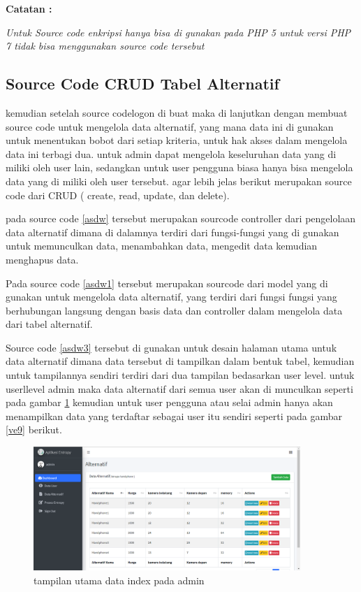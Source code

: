 \textbf{Catatan :}\par
\textit{Untuk Source code enkripsi hanya bisa di gunakan pada PHP 5 untuk versi PHP 7 tidak bisa menggunakan source code tersebut}
\pagebreak

\subsection{Source Code CRUD Tabel Alternatif}
	kemudian setelah source codelogon di buat maka di lanjutkan dengan membuat source code untuk mengelola data alternatif, yang mana data ini di gunakan untuk menentukan bobot dari setiap kriteria, untuk hak akses dalam mengelola data ini terbagi dua. untuk admin dapat mengelola keseluruhan data yang di miliki oleh user lain, sedangkan untuk user pengguna biasa hanya bisa mengelola data yang di miliki oleh user tersebut. agar lebih jelas berikut merupakan source code dari CRUD ( create, read, update, dan delete).

	pada source code \ref{asdw} tersebut merupakan sourcode controller dari pengelolaan data alternatif dimana di dalamnya terdiri dari fungsi-fungsi yang di gunakan untuk memunculkan data, menambahkan data, mengedit data kemudian menghapus data.

	Pada source code \ref{asdw1} tersebut merupakan sourcode dari model yang di gunakan untuk mengelola data alternatif, yang terdiri dari fungsi fungsi yang berhubungan langsung dengan basis data dan controller dalam mengelola data dari tabel alternatif.

	Source code \ref{asdw3} tersebut di gunakan untuk desain halaman utama untuk data alternatif dimana data tersebut di tampilkan dalam bentuk tabel, kemudian untuk tampilannya sendiri terdiri dari dua tampilan bedasarkan user level. untuk userllevel admin maka data alternatif dari semua user akan di munculkan seperti pada gambar \ref{ve8} kemudian untuk user pengguna atau selai admin hanya akan menampilkan data yang terdaftar sebagai user itu sendiri seperti pada gambar \ref{ve9} berikut.
\begin{figure}[!htbp]
	\centerline{\includegraphics[width=0.90\textwidth]{figures/alt/idx1.png}}
	\caption{tampilan utama data index pada admin}
	\label{ve8}
\end{figure}

